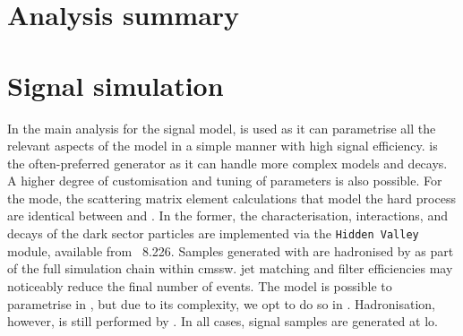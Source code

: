 

\section{Analysis summary}
\label{sec:svj_overview}





\section{Signal simulation}
\label{sec:signal_sim}

In the main analysis for the \schannel signal model, \PYTHIA is used as it can parametrise all the relevant aspects of the model in a simple manner with high signal efficiency. \MADGRAPH is the often-preferred generator as it can handle more complex models and decays. A higher degree of customisation and tuning of parameters is also possible. For the \schannel mode, the scattering matrix element calculations that model the hard process are identical between \PYTHIA and \MADGRAPH. In the former, the characterisation, interactions, and decays of the dark sector particles are implemented via the \texttt{Hidden Valley} module, available from \PYTHIA~8.226. Samples generated with \MADGRAPH are hadronised by \PYTHIA as part of the full simulation chain within \acrshort{cmssw}. \Gls{jet} matching and filter efficiencies may noticeably reduce the final number of events. The \tchannel model is possible to parametrise in \PYTHIA, but due to its complexity, we opt to do so in \MADGRAPH. Hadronisation, however, is still performed by \PYTHIA. In all cases, signal samples are generated at \acrfull{lo}.


